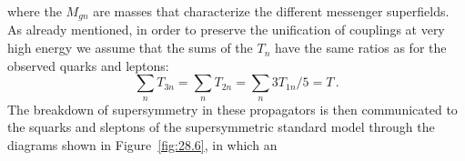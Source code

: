 where the \(M_{gn}\) are masses that characterize the different messenger
superfields. As already mentioned, in order to preserve the unification of
couplings at very high energy we assume that the sums of the \(T_n\) have
the same ratios as for the observed quarks and leptons:
\begin{equation}
  \sum_n T_{3n}=\sum_n T_{2n}=\sum_n 3T_{1n}/5=T\,.
  \tag{28.6.3}\label{eq:28.6.3}
\end{equation}
The breakdown of supersymmetry in these propagators is then communicated
to the squarks and sleptons of the supersymmetric standard model through
the diagrams shown in Figure~\ref{fig:28.6}, in which an


